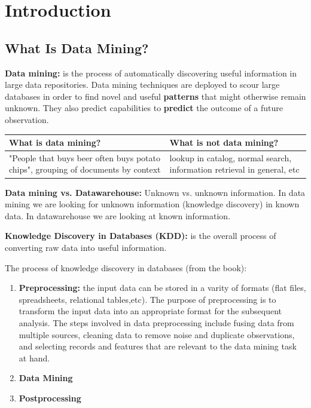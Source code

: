 \chapter{Introduction}
\clearpage

\section{What Is Data Mining?}
	
	{\bf Data mining:} is the process of automatically discovering useful information
	in large data repositories. Data mining techniques are deployed to scour large 
	databases in order to find novel and useful {\bf patterns} that might otherwise remain 
	unknown. They also predict capabilities to {\bf predict} the outcome of a future 
	observation.

	\begin{table}[H]
	\begin{tabular}{| p{6cm} | p{6cm} |}
		\hline
		{\bf What is data mining?} & {\bf What is not data mining?} \\ \hline
		"People that buys beer often buys potato chips", 
		grouping of documents by context & 
		lookup in catalog, normal search, information retrieval in general, etc \\ \hline
	\end{tabular}
	\end{table}	

	{\bf Data mining vs. Datawarehouse:} Unknown vs. unknown information. 
	In data mining we are looking for unknown information (knowledge discovery) in known data. 
	In datawarehouse we are looking at known information. 

	{\bf Knowledge Discovery in Databases (KDD): } is the overall process of converting raw 
	data into useful information. 

	The process of knowledge discovery in databases (from the book):
	\begin{enumerate}
		\item {\bf Preprocessing:} the input data can be stored in a varity of formats (flat files, spreadsheets, relational tables,etc). The purpose of preprocessing is to transform the input data into an appropriate format for the subsequent analysis. The steps involved in data preprocessing include fusing data from multiple sources, cleaning data to remove noise and duplicate observations, and selecting records and features that are relevant to the data mining task at hand. 
		\item {\bf Data Mining}
		\item {\bf Postprocessing}
	\end{enumerate}

